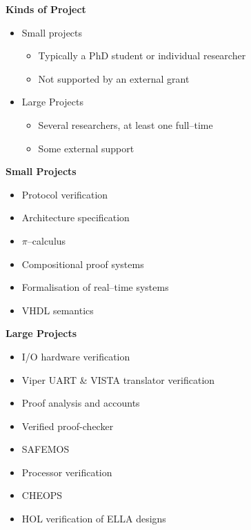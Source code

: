 \begin{center} \bf Kinds of Project \end{center}
\begin{itemize}
\item Small projects
\begin{itemize}
\item Typically a PhD student or individual researcher
\item Not supported by an external grant
\end{itemize}
\item Large Projects
\begin{itemize}
\item Several researchers, at least one full--time
\item Some external support
\end{itemize}
\end{itemize}


\begin{center}{\bf Small Projects} \end{center}
\begin{itemize}
\item Protocol verification
\item Architecture specification
\item $\pi$--calculus
\item Compositional proof systems
\item Formalisation of real--time systems
\item {\small VHDL} semantics
\end{itemize}

\begin{center}{\bf Large Projects} \end{center}
\begin{itemize}
\item I/O hardware verification
\item Viper {\small UART} \& {\small VISTA} translator verification
\item Proof analysis and accounts
\item Verified proof-checker
\item {\small SAFEMOS}
\item Processor verification
\item {\small CHEOPS}
\item {\small HOL} verification of {\small ELLA} designs
\end{itemize}

